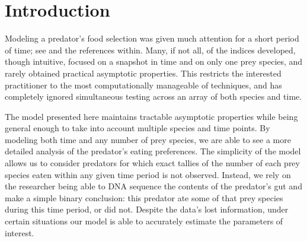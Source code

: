 \section{Introduction}
\label{sec:intro}

Modeling a predator's food selection was given much attention for a short period of time; see \citet{Strauss:1979} and the references within.  Many, if not all, of the indices developed, though intuitive, focused on a snapshot in time and on only one prey species, and rarely obtained practical asymptotic properties.  This restricts the interested practitioner to the most computationally manageable of techniques, and has completely ignored simultaneous testing across an array of both species and time.

The model presented here maintains tractable asymptotic properties while being general enough to take into account multiple species and time points.  By modeling both time and any number of prey species, we are able to see a more detailed analysis of the predator's eating preferences.  The simplicity of the model allows us to consider predators for which exact tallies of the number of each prey species eaten within any given time period is not observed.  Instead, we rely on the researcher being able to DNA sequence the contents of the predator's gut and make a simple binary conclusion: this predator ate some of that prey species during this time period, or did not.  Despite the data's lost information, under certain situations our model is able to accurately estimate the parameters of interest.

